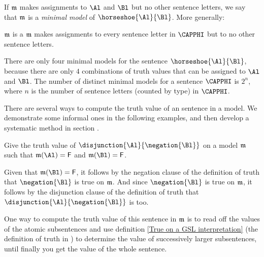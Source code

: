 If $\mathfrak{m}$ makes assignments to $\Al$ and $\Bl$ but no other sentence letters, we say that $\mathfrak{m}$ is a \emph{minimal model} of $\horseshoe{\Al}{\Bl}$. More generally:

\begin{majorILnc}{}
	$\mathfrak{m}$ is a  \Iff $\mathfrak{m}$ makes assignments to every sentence letter in $\CAPPHI$ but to no other sentence letters.
\end{majorILnc}

\noindent{}There are only four minimal models for the sentence $\horseshoe{\Al}{\Bl}$, because there are only $4$ combinations of truth values that can be assigned to $\Al$ and $\Bl$. The number of distinct minimal models for a sentence $\CAPPHI$ is $2^n$, where $n$ is the number of sentence letters (counted by type) in $\CAPPHI$.

There are several ways to compute the truth value of an \GSL{} sentence in a model.
We demonstrate some informal ones in the following examples, and then develop a systematic method in section . 

\begin{majorILnc}{}
	Give the truth value of $\disjunction{\Al}{\negation{\Bl}}$ on a model $\mathfrak{m}$ such that $\IntA(\Al)=\FalseB$ and $\IntA(\Bl)=\FalseB$.
	
	\begin{PROOF}	
		Given that $\IntA(\Bl)=\FalseB$, it follows by the negation clause of the definition of truth that $\negation{\Bl}$ is true on $\mathfrak{m}$. 
		And since $\negation{\Bl}$ is true on $\mathfrak{m}$, it follows by the disjunction clause of the definition of truth that $\disjunction{\Al}{\negation{\Bl}}$ is too.
	\end{PROOF}

	\begin{commentary}
		One way to compute the truth value of this sentence in $\mathfrak{m}$ is to read off the values of the atomic subsentences and use definition \ref{True on a GSL interpretation} (the definition of truth in \GSL{}) to determine the value of successively larger subsentences, until finally you get the value of the whole sentence.
	\end{commentary}
		
\end{majorILnc}

